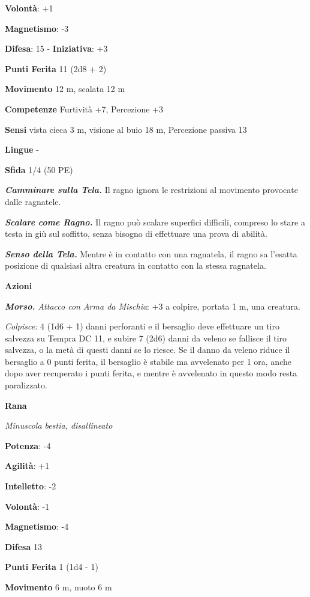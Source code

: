 \begin{multicols}{2}
\textbf{Volontà}: +1

\textbf{Magnetismo}: -3

\textbf{Difesa}: 15 - \textbf{Iniziativa}: +3

\textbf{Punti Ferita} 11 (2d8 + 2)

\textbf{Movimento} 12 m, scalata 12 m

\textbf{Competenze} Furtività +7, Percezione +3

\textbf{Sensi} vista cieca 3 m, visione al buio 18 m, Percezione passiva
13

\textbf{Lingue} -

\textbf{Sfida} 1/4 (50 PE)\smallskip

\emph{\textbf{Camminare sulla Tela.}} Il ragno ignora le restrizioni al
movimento provocate dalle ragnatele.

\emph{\textbf{Scalare come Ragno.}} Il ragno può scalare superfici
difficili, compreso lo stare a testa in giù sul soffitto, senza bisogno
di effettuare una prova di abilità.

\emph{\textbf{Senso della Tela.}} Mentre è in contatto con una
ragnatela, il ragno sa l'esatta posizione di qualsiasi altra creatura in
contatto con la stessa ragnatela.

\smallskip\textbf{Azioni}

\emph{\textbf{Morso.} Attacco con Arma da Mischia}: +3 a colpire,
portata 1 m, una creatura.

\emph{Colpisce:} 4 (1d6 + 1) danni perforanti e il bersaglio deve
effettuare un tiro salvezza su Tempra DC 11, e subire 7 (2d6)
danni da veleno se fallisce il tiro salvezza, o la metà di questi danni
se lo riesce. Se il danno da veleno riduce il bersaglio a 0 punti
ferita, il bersaglio è stabile ma avvelenato per 1 ora, anche dopo aver
recuperato i punti ferita, e mentre è avvelenato in questo modo resta
paralizzato.

\textbf{Rana}

\emph{Minuscola bestia, disallineato}

\textbf{Potenza}: -4

\textbf{Agilità}: +1

\textbf{Intelletto}: -2

\textbf{Volontà}: -1

\textbf{Magnetismo}: -4

\textbf{Difesa} 13

\textbf{Punti Ferita} 1 (1d4 - 1)

\textbf{Movimento} 6 m, nuoto 6 m


\end{multicols}
